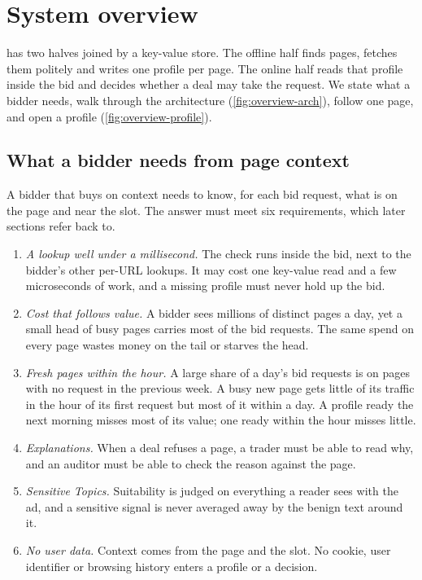 \section{System overview}\label{sec:overview}

\sys{} has two halves joined by a key-value store. The offline half finds pages, fetches them politely and writes one profile per page. The online half reads that profile inside the bid and decides whether a deal may take the request. We state what a bidder needs, walk through the architecture (\cref{fig:overview-arch}), follow one page, and open a profile (\cref{fig:overview-profile}).

\subsection{What a bidder needs from page context}\label{sec:overview-req}

A bidder that buys on context needs to know, for each bid request, what is on the page and near the slot. The answer must meet six requirements, which later sections refer back to.

\begin{enumerate}[label=\textbf{R\arabic*},leftmargin=2.4em,itemsep=2pt]
\item\label{req:latency} \emph{A lookup well under a millisecond.} The check runs inside the bid, next to the bidder's other per-URL lookups. It may cost one key-value read and a few microseconds of work, and a missing profile must never hold up the bid.
\item\label{req:cost} \emph{Cost that follows value.} A bidder sees millions of distinct pages a day, yet a small head of busy pages carries most of the bid requests. The same spend on every page wastes money on the tail or starves the head.
\item\label{req:fresh} \emph{Fresh pages within the hour.} A large share of a day's bid requests is on pages with no request in the previous week. A busy new page gets little of its traffic in the hour of its first request but most of it within a day. A profile ready the next morning misses most of its value; one ready within the hour misses little.
\item\label{req:explain} \emph{Explanations.} When a deal refuses a page, a trader must be able to read why, and an auditor must be able to check the reason against the page.
\item\label{req:sensitive} \emph{Sensitive Topics.} Suitability is judged on everything a reader sees with the ad, and a sensitive signal is never averaged away by the benign text around it.
\item\label{req:nouser} \emph{No user data.} Context comes from the page and the slot. No cookie, user identifier or browsing history enters a profile or a decision.
\end{enumerate}

